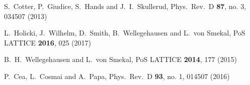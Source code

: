 \documentclass{PoS}
\begin{document}
\begin{thebibliography}{99}
  S.~Cotter, P.~Giudice, S.~Hands and J.~I.~Skullerud,
  Phys.\ Rev.\ D {\bf 87}, no. 3, 034507 (2013)
  
  L.~Holicki, J.~Wilhelm, D.~Smith, B.~Wellegehausen and L.~von Smekal,
  PoS LATTICE {\bf 2016}, 025 (2017)
  
  B.~H.~Wellegehausen and L.~von Smekal,
  PoS LATTICE {\bf 2014}, 177 (2015)
  
  P.~Cea, L.~Cosmai and A.~Papa,
  Phys.\ Rev.\ D {\bf 93}, no. 1, 014507 (2016)


  
  
  
  
  
  
  
  
  
  
  
  
  


\end{thebibliography}
\end{document}

